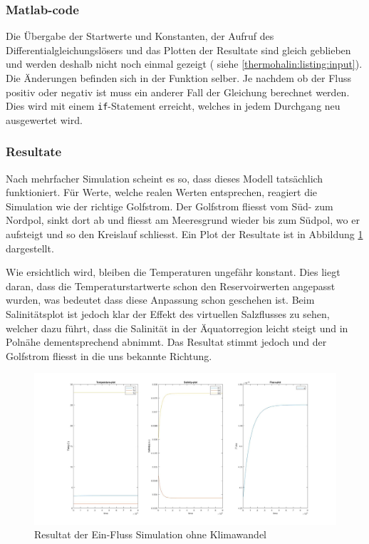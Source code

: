 \subsubsection{Matlab-code}

Die Übergabe der Startwerte und Konstanten, der Aufruf des Differentialgleichungslösers und das Plotten der Resultate sind gleich geblieben und werden deshalb nicht noch einmal gezeigt ( siehe  \ref{thermohalin:listing:input}). Die Änderungen befinden sich in der Funktion selber. Je nachdem ob der Fluss positiv oder negativ ist muss ein anderer Fall der Gleichung berechnet werden. Dies wird mit einem \texttt{if}-Statement erreicht, welches in jedem Durchgang neu ausgewertet wird. 




\subsubsection{Resultate} 

Nach mehrfacher Simulation scheint es so, dass dieses Modell tatsächlich funktioniert. Für Werte, welche realen Werten entsprechen, reagiert die Simulation wie der richtige Golfstrom. Der Golfstrom fliesst vom Süd- zum Nordpol, sinkt dort ab und fliesst am Meeresgrund wieder bis zum Südpol, wo er aufsteigt und so den Kreislauf schliesst. Ein Plot der Resultate ist in Abbildung \ref{thermohalin:3b1f-skript} dargestellt.

Wie ersichtlich wird, bleiben die Temperaturen ungefähr konstant. Dies liegt daran, dass die Temperaturstartwerte schon den Reservoirwerten angepasst wurden, was bedeutet dass diese Anpassung schon geschehen ist. Beim Salinitätsplot ist jedoch klar der Effekt des virtuellen Salzflusses zu sehen, welcher dazu führt, dass die Salinität in der Äquatorregion leicht steigt und in Polnähe dementsprechend abnimmt. Das Resultat stimmt jedoch und der Golfstrom fliesst in die uns bekannte Richtung.

\begin{figure}
	\centering
	\includegraphics[width=14cm]{thermohalin/Code/graphs/3b1f-skript.jpg}
	\caption{Resultat der Ein-Fluss Simulation ohne Klimawandel}
	\label{thermohalin:3b1f-skript}
\end{figure}

